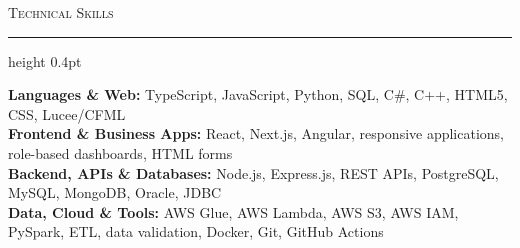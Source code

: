 \documentclass[letterpaper,11pt]{article}
\newcommand{\resumesection}[1]{%
  \par\vspace{2pt}%
  {\large\scshape #1}\par\vspace{2pt}%
  \hrule height 0.4pt\vspace{2pt}%
}
\begin{document}
\resumesection{Technical Skills}
\textbf{Languages \& Web:} TypeScript, JavaScript, Python, SQL, C\#, C++, HTML5, CSS, Lucee/CFML\\
\textbf{Frontend \& Business Apps:} React, Next.js, Angular, responsive applications, role-based dashboards, HTML forms\\
\textbf{Backend, APIs \& Databases:} Node.js, Express.js, REST APIs, PostgreSQL, MySQL, MongoDB, Oracle, JDBC\\
\textbf{Data, Cloud \& Tools:} AWS Glue, AWS Lambda, AWS S3, AWS IAM, PySpark, ETL, data validation, Docker, Git, GitHub Actions
\end{document}
